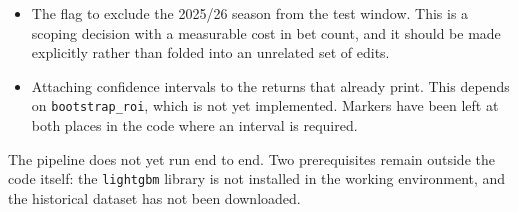 \documentclass[11pt,a4paper]{article}
\newcommand{\code}[1]{\texttt{#1}}
\begin{document}
\begin{itemize}
  \item The flag to exclude the 2025/26 season from the test window. This is
        a scoping decision with a measurable cost in bet count, and it should
        be made explicitly rather than folded into an unrelated set of edits.
  \item Attaching confidence intervals to the returns that already print.
        This depends on \code{bootstrap\_roi}, which is not yet implemented.
        Markers have been left at both places in the code where an interval
        is required.
\end{itemize}

The pipeline does not yet run end to end. Two prerequisites remain outside the
code itself: the \code{lightgbm} library is not installed in the working
environment, and the historical dataset has not been downloaded.
\end{document}
